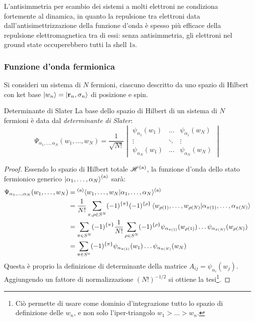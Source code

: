 L'antisimmetria per scambio dei sistemi a molti elettroni ne condiziona fortemente al dinamica, in quanto la repulsione tra elettroni data dall'antisimettrizzazione della funzione d'onda è spesso più efficace della repulsione elettromagnetica tra di essi: senza antisimmetria, gli elettroni nel ground state occuperebbero tutti la shell $ \text{1s} $.

\subsubsection{Funzione d'onda fermionica}

Si consideri un sistema di $ N $ fermioni, ciascuno descritto da uno spazio di Hilbert con ket base $ \ket{w_n} = \ket{\mathbf{r}_n , \sigma_n} $ di posizione e spin.

\begin{theorem}{Determinante di Slater}{}
	La base dello spazio di Hilbert di un sistema di $ N $ fermioni è data dal \textit{determinante di Slater}:
	\begin{equation}
		\Psi_{\alpha_1 , \dots , \alpha_N}(w_1 , \dots , w_N) = \frac{1}{\sqrt{N!}}
		\begin{vmatrix}
			\psi_{\alpha_1}(w_1) & \dots & \psi_{\alpha_1}(w_N) \\
			\vdots & \ddots & \vdots \\
			\psi_{\alpha_N}(w_1) & \dots & \psi_{\alpha_N}(w_N)
		\end{vmatrix}
	\end{equation}

	\tcblower

	\begin{proof}
		Essendo lo spazio di Hilbert totale $ \mathscr{H}^\text{(a)} $, la funzione d'onda dello stato fermionico generico $ \ket{\alpha_1 , \dots , \alpha_N}^\text{(a)} $ sarà:
		\begin{equation*}
			\begin{split}
				\Psi_{\alpha_1 , \dots , \alpha_N}(w_1 , \dots , w_N)
				& = {^\text{(a)}\langle}w_1 , \dots , w_N | \alpha_1 , \dots , \alpha_N{\rangle^\text{(a)}} \\
				& = \frac{1}{N!} \sum_{\pi,\rho \in S^N} (-1)^{\{\pi\}} (-1)^{\{\rho\}} \braket{w_{\rho(1)} , \dots , w_{\rho(N)} | \alpha_{\pi(1)} , \dots , \alpha_{\pi(N)}} \\
				& = \sum_{\pi \in S^N} (-1)^{\{\pi\}} \frac{1}{N!} \sum_{\rho \in S^N} (-1)^{\{\rho\}} \psi_{\alpha_{\pi(1)}}(w_{\rho(1)}) \dots \psi_{\alpha_{\pi(N)}}(w_{\rho(N)}) \\
				& = \sum_{\pi \in S^n} (-1)^{\{\pi\}} \psi_{\alpha_{\pi(1)}}(w_1) \dots \psi_{\alpha_{\pi(N)}}(w_N)
			\end{split}
		\end{equation*}
		Questa è proprio la definizione di determinante della matrice $ A_{ij} = \psi_{\alpha_i}(w_j) $. Aggiungendo un fattore di normalizzazione $ (N!)^{-1/2} $ si ottiene la tesi\footnote{Ciò permette di usare come dominio d'integrazione tutto lo spazio di definizione delle $ w_n $, e non solo l'iper-triangolo $ w_1 > \dots > w_n $.}.
	\end{proof}
\end{theorem}

